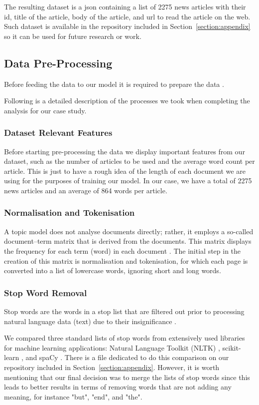 \documentclass[twoside,12pt,a4paper]{article}
\begin{document}
The resulting dataset is a json containing a list of 2275 news articles with their id, title of the article, body of the article, and url to read the article on the web. Such dataset is available in the repository included in Section~\ref{section:appendix} so it can be used for future research or work.

\subsection{Data Pre-Processing}
Before feeding the data to our model it is required to prepare the data \citep{jacobi_quantitative_2016}.

Following is a detailed description of the processes we took when completing the analysis for our case study. 

\subsubsection{Dataset Relevant Features}
Before starting pre-processing the data we display important features from our dataset, such as the number of articles to be used and the average word count per article. This is just to have a rough idea of the length of each document we are using for the purposes of training our model. In our case, we have a total of 2275 news articles and an average of 864 words per article.

\subsubsection{Normalisation and Tokenisation}
A topic model does not analyse documents directly; rather, it employs a so-called document–term matrix that is derived from the documents. This matrix displays the frequency for each term (word) in each document \citep{jacobi_quantitative_2016}. The initial step in the creation of this matrix is normalisation and tokenisation, for which each page is converted into a list of lowercase words, ignoring short and long words.

\subsubsection{Stop Word Removal}
Stop words are the words in a stop list that are filtered out prior to processing natural language data (text) due to their insignificance \citep{rajaraman_mining_2011}.

We compared three standard lists of stop words from extensively used libraries for machine learning applications: Natural Language Toolkit (NLTK) \citep{bird_natural_nodate}, scikit-learn \citep{pedregosa_scikit-learn_nodate}, and spaCy \citep{spacy2}. There is a file dedicated to do this comparison on our repository included in Section~\ref{section:appendix}. However, it is worth mentioning that our final decision was to merge the lists of stop words since this leads to better results in terms of removing words that are not adding any meaning, for instance "but", "end", and "the".
\end{document}
